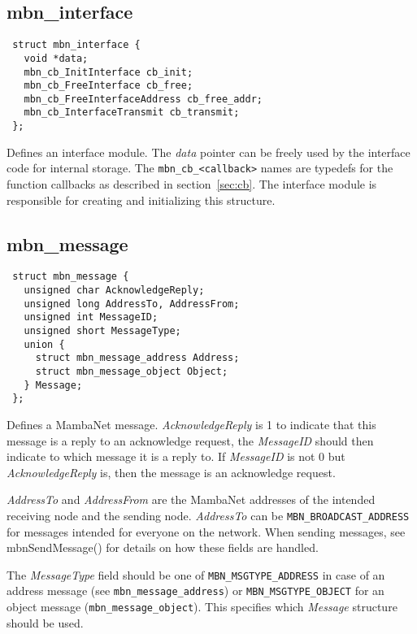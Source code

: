 \subsection{mbn\_interface}
\begin{verbatim}
 struct mbn_interface {
   void *data;
   mbn_cb_InitInterface cb_init;
   mbn_cb_FreeInterface cb_free;
   mbn_cb_FreeInterfaceAddress cb_free_addr;
   mbn_cb_InterfaceTransmit cb_transmit;
 };
\end{verbatim}
Defines an interface module. The \textit{data} pointer can be freely used by the interface code for internal storage. The \verb|mbn_cb_<callback>| names are typedefs for the function callbacks as described in section\ \ref{sec:cb}.
The interface module is responsible for creating and initializing this structure.


\subsection{mbn\_message}
\begin{verbatim}
 struct mbn_message {
   unsigned char AcknowledgeReply;
   unsigned long AddressTo, AddressFrom;
   unsigned int MessageID;
   unsigned short MessageType;
   union {
     struct mbn_message_address Address;
     struct mbn_message_object Object;
   } Message;
 };
\end{verbatim}
Defines a MambaNet message. \textit{AcknowledgeReply} is 1 to indicate that this message is a reply to an acknowledge request, the \textit{MessageID} should then indicate to which message it is a reply to. If \textit{MessageID} is not 0 but \textit{AcknowledgeReply} is, then the message is an acknowledge request.

\textit{AddressTo} and \textit{AddressFrom} are the MambaNet addresses of the intended receiving node and the sending node. \textit{AddressTo} can be \verb|MBN_BROADCAST_ADDRESS| for messages intended for everyone on the network. When sending messages, see mbnSendMessage() for details on how these fields are handled.

The \textit{MessageType} field should be one of \verb|MBN_MSGTYPE_ADDRESS| in case of an address message (see \verb|mbn_message_address|) or \verb|MBN_MSGTYPE_OBJECT| for an object message (\verb|mbn_message_object|). This specifies which \textit{Message} structure should be used.


